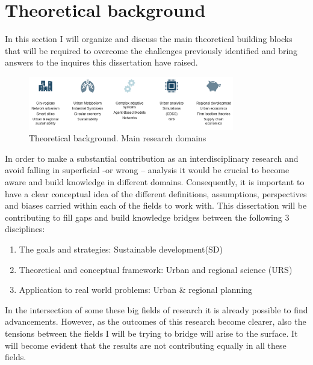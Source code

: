 \chapter{Theoretical background}

In this section I will organize and discuss the main theoretical building blocks that will be required to overcome the challenges previously identified and bring answers to the inquires this dissertation have raised. \par

\begin{figure}[h!]
    \centering
    \includegraphics[width=0.8\textwidth]{sections/asset/theo.PNG}
    \caption{Theoretical background. Main research domains}
    \label{fig:theo}
\end{figure}

In order to make a substantial contribution as an interdisciplinary research and avoid falling in superficial -or wrong – analysis it would be crucial to become aware and build knowledge in different domains. Consequently, it is important to have a clear conceptual idea of the different definitions, assumptions, perspectives and biases carried within each of the fields to work with.
This dissertation will be contributing to fill gaps and build knowledge bridges between the following 3 disciplines:\par

\begin{enumerate}
    \item The goals and strategies: Sustainable development(SD)
    \item Theoretical and conceptual framework: Urban and regional science (URS)
    \item Application to real world problems: Urban \& regional planning
\end{enumerate}

In the intersection of some these big fields of research it is already possible to find advancements. However, as the outcomes of this research become clearer, also the tensions between the fields I will be trying to bridge will arise to the surface. It will become evident that the results are not contributing equally in all these fields. \par

